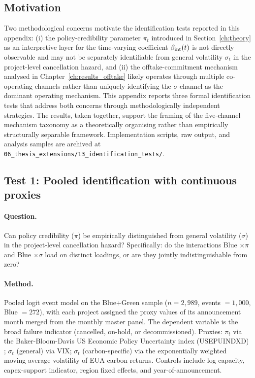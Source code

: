 \subsection*{Motivation}

Two methodological concerns motivate the identification tests reported in this appendix: (i) the policy-credibility parameter $\pi_t$ introduced in Section~\ref{ch:theory} as an interpretive layer for the time-varying coefficient $\beta_{\mathrm{int}}(t)$ is not directly observable and may not be separately identifiable from general volatility $\sigma_t$ in the project-level cancellation hazard, and (ii) the offtake-commitment mechanism analysed in Chapter~\ref{ch:results_offtake} likely operates through multiple co-operating channels rather than uniquely identifying the $\sigma$-channel as the dominant operating mechanism. This appendix reports three formal identification tests that address both concerns through methodologically independent strategies. The results, taken together, support the framing of the five-channel mechanism taxonomy as a theoretically organising rather than empirically structurally separable framework. Implementation scripts, raw output, and analysis samples are archived at \texttt{06\_thesis\_extensions/13\_identification\_tests/}.

\subsection*{Test 1: Pooled identification with continuous proxies}

\paragraph{Question.} Can policy credibility ($\pi$) be empirically distinguished from general volatility ($\sigma$) in the project-level cancellation hazard? Specifically: do the interactions Blue $\times \pi$ and Blue $\times \sigma$ load on distinct loadings, or are they jointly indistinguishable from zero?

\paragraph{Method.} Pooled logit event model on the Blue+Green sample ($n=2{,}989$, events $=1{,}000$, Blue $=272$), with each project assigned the proxy values of its announcement month merged from the monthly master panel. The dependent variable is the broad failure indicator (cancelled, on-hold, or decommissioned). Proxies: $\pi_t$ via the Baker-Bloom-Davis US Economic Policy Uncertainty index (USEPUINDXD) \cite{baker2016measuring}; $\sigma_t$ (general) via VIX; $\sigma_t$ (carbon-specific) via the exponentially weighted moving-average volatility of EUA carbon returns. Controls include log capacity, capex-support indicator, region fixed effects, and year-of-announcement.

